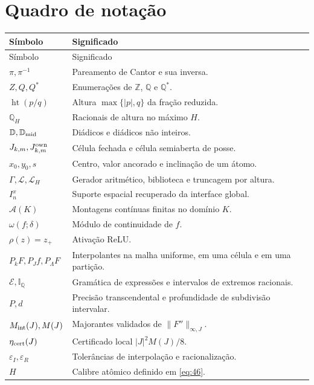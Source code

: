\documentclass[11pt,a4paper]{article}
\theoremstyle{preciso}
\theoremstyle{definition}
\newcommand{\Z}{\mathbb Z}
\newcommand{\Q}{\mathbb Q}
\newcommand{\D}{\mathbb D}
\newcommand{\LL}{\mathcal L}
\newcommand{\Asm}{\mathcal A}
\newcommand{\EE}{\mathcal E}
\newcommand{\heightq}{\operatorname{ht}}
\begin{document}


\section{Quadro de notação}
\footnotesize
\renewcommand{\arraystretch}{1.1}
\begin{longtable}{@{}p{.28\linewidth}p{.68\linewidth}@{}}
\toprule Símbolo&Significado\\\midrule
\endfirsthead
\toprule Símbolo&Significado\\\midrule
\endhead
\bottomrule\endfoot
$\pi,\pi^{-1}$&Pareamento de Cantor e sua inversa.\\
$Z,Q,Q^*$&Enumerações de $\Z$, $\Q$ e $\Q^*$.\\
$\heightq(p/q)$&Altura $\max\{|p|,q\}$ da fração reduzida.\\
$\Q_H$&Racionais de altura no máximo $H$.\\
$\D,\D_{\rm mid}$&Diádicos e diádicos não inteiros.\\
$J_{k,m},J_{k,m}^{\rm own}$&Célula fechada e célula semiaberta de posse.\\
$x_0,y_0,s$&Centro, valor ancorado e inclinação de um átomo.\\
$\Gamma,\LL,\LL_H$&Gerador aritmético, biblioteca e truncagem por altura.\\
$I_n^x$&Suporte espacial recuperado da interface global.\\
$\Asm(K)$&Montagens contínuas finitas no domínio $K$.\\
$\omega(f;\delta)$&Módulo de continuidade de $f$.\\
$\rho(z)=z_+$&Ativação ReLU.\\
$P_kF,P_Jf,P_\Lambda F$&Interpolantes na malha uniforme, em uma célula e em uma partição.\\
$\EE,\mathbb I_{\Q}$&Gramática de expressões e intervalos de extremos racionais.\\
$P,d$&Precisão transcendental e profundidade de subdivisão intervalar.\\
$M_{\rm int}(J),M(J)$&Majorantes validados de $\|F''\|_{\infty,J}$.\\
$\eta_{\rm cert}(J)$&Certificado local $|J|^2M(J)/8$.\\
$\varepsilon_I,\varepsilon_R$&Tolerâncias de interpolação e racionalização.\\
$H$&Calibre atômico definido em \eqref{eq:46}.\\

\end{longtable}
\end{document}
